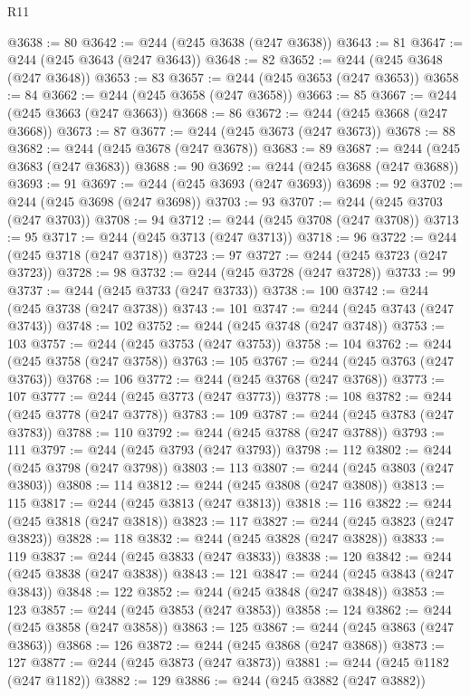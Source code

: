 \begin{lexlean}{R11}
\begin{coremodule}
@3638 := 80
@3642 := @244 (@245 @3638 (@247 @3638))
@3643 := 81
@3647 := @244 (@245 @3643 (@247 @3643))
@3648 := 82
@3652 := @244 (@245 @3648 (@247 @3648))
@3653 := 83
@3657 := @244 (@245 @3653 (@247 @3653))
@3658 := 84
@3662 := @244 (@245 @3658 (@247 @3658))
@3663 := 85
@3667 := @244 (@245 @3663 (@247 @3663))
@3668 := 86
@3672 := @244 (@245 @3668 (@247 @3668))
@3673 := 87
@3677 := @244 (@245 @3673 (@247 @3673))
@3678 := 88
@3682 := @244 (@245 @3678 (@247 @3678))
@3683 := 89
@3687 := @244 (@245 @3683 (@247 @3683))
@3688 := 90
@3692 := @244 (@245 @3688 (@247 @3688))
@3693 := 91
@3697 := @244 (@245 @3693 (@247 @3693))
@3698 := 92
@3702 := @244 (@245 @3698 (@247 @3698))
@3703 := 93
@3707 := @244 (@245 @3703 (@247 @3703))
@3708 := 94
@3712 := @244 (@245 @3708 (@247 @3708))
@3713 := 95
@3717 := @244 (@245 @3713 (@247 @3713))
@3718 := 96
@3722 := @244 (@245 @3718 (@247 @3718))
@3723 := 97
@3727 := @244 (@245 @3723 (@247 @3723))
@3728 := 98
@3732 := @244 (@245 @3728 (@247 @3728))
@3733 := 99
@3737 := @244 (@245 @3733 (@247 @3733))
@3738 := 100
@3742 := @244 (@245 @3738 (@247 @3738))
@3743 := 101
@3747 := @244 (@245 @3743 (@247 @3743))
@3748 := 102
@3752 := @244 (@245 @3748 (@247 @3748))
@3753 := 103
@3757 := @244 (@245 @3753 (@247 @3753))
@3758 := 104
@3762 := @244 (@245 @3758 (@247 @3758))
@3763 := 105
@3767 := @244 (@245 @3763 (@247 @3763))
@3768 := 106
@3772 := @244 (@245 @3768 (@247 @3768))
@3773 := 107
@3777 := @244 (@245 @3773 (@247 @3773))
@3778 := 108
@3782 := @244 (@245 @3778 (@247 @3778))
@3783 := 109
@3787 := @244 (@245 @3783 (@247 @3783))
@3788 := 110
@3792 := @244 (@245 @3788 (@247 @3788))
@3793 := 111
@3797 := @244 (@245 @3793 (@247 @3793))
@3798 := 112
@3802 := @244 (@245 @3798 (@247 @3798))
@3803 := 113
@3807 := @244 (@245 @3803 (@247 @3803))
@3808 := 114
@3812 := @244 (@245 @3808 (@247 @3808))
@3813 := 115
@3817 := @244 (@245 @3813 (@247 @3813))
@3818 := 116
@3822 := @244 (@245 @3818 (@247 @3818))
@3823 := 117
@3827 := @244 (@245 @3823 (@247 @3823))
@3828 := 118
@3832 := @244 (@245 @3828 (@247 @3828))
@3833 := 119
@3837 := @244 (@245 @3833 (@247 @3833))
@3838 := 120
@3842 := @244 (@245 @3838 (@247 @3838))
@3843 := 121
@3847 := @244 (@245 @3843 (@247 @3843))
@3848 := 122
@3852 := @244 (@245 @3848 (@247 @3848))
@3853 := 123
@3857 := @244 (@245 @3853 (@247 @3853))
@3858 := 124
@3862 := @244 (@245 @3858 (@247 @3858))
@3863 := 125
@3867 := @244 (@245 @3863 (@247 @3863))
@3868 := 126
@3872 := @244 (@245 @3868 (@247 @3868))
@3873 := 127
@3877 := @244 (@245 @3873 (@247 @3873))
@3881 := @244 (@245 @1182 (@247 @1182))
@3882 := 129
@3886 := @244 (@245 @3882 (@247 @3882))

\end{coremodule}
\end{lexlean}
